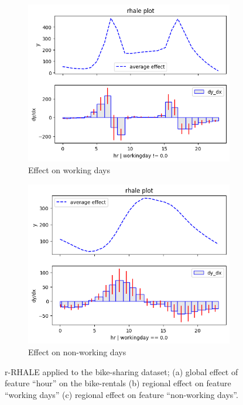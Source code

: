 \documentclass[
twocolumn,
]{ceurart}
\begin{document}
\begin{figure}
  \begin{subfigure}[t]{0.24\textwidth}
  \centering
  \includegraphics[width=\linewidth]{figures/running_example/01_bike_sharing_dataset_29_1.png}
  \caption{Effect on working days}
  \label{subfig:regional_a}
  \end{subfigure}
  \begin{subfigure}[t]{0.24\textwidth}
  \centering  
  \includegraphics[width=\linewidth]{figures/running_example/01_bike_sharing_dataset_29_0.png}
  \caption{Effect on non-working days}
  \label{subfig:regional_b}
  \end{subfigure}
  \caption{r-RHALE applied to the bike-sharing dataset; (a) global effect of feature ``hour'' on the bike-rentals (b) regional effect on feature ``working days'' (c) regional effect on feature ``non-working days''.}
  \label{fig:main-concept}
\end{figure}
\end{document}
